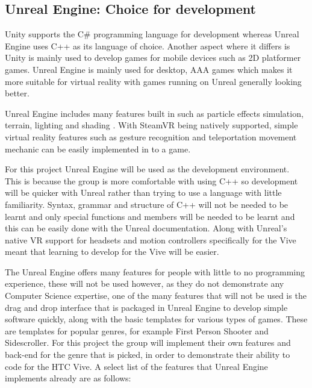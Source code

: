 \subsection{Unreal Engine: Choice for development}
Unity supports the C\# programming language for development whereas Unreal Engine uses C++ as its language of choice. Another aspect where it differs is Unity is mainly used to develop games for mobile devices such as 2D platformer games. Unreal Engine is mainly used for desktop, AAA games which makes it more suitable for virtual reality with games running on Unreal generally looking better.
\newline
\par
Unreal Engine includes many features built in such as particle effects simulation, terrain, lighting and shading \cite{unrealfeatures}. With SteamVR being natively supported, simple virtual reality features such as gesture recognition and teleportation movement mechanic can be easily implemented in to a game.
\newline
\par
For this project Unreal Engine will be used as the development environment. This is because the group is more comfortable with using C++ so development will be quicker with Unreal rather than trying to use a language with little familiarity. Syntax, grammar and structure of C++ will not be needed to be learnt and only special functions and members will be needed to be learnt and this can be easily done with the Unreal documentation. Along with Unreal's native VR support for headsets and motion controllers specifically for the Vive meant that learning to develop for the Vive will be easier.
\newline
\par
The Unreal Engine offers many features for people with little to no programming experience, these will not be used however, as they do not demonstrate any Computer Science expertise, one of the many features that will not be used is the drag and drop interface that is packaged in Unreal Engine to develop simple software quickly, along with the basic templates for various types of games. These are templates for popular genres, for example First Person Shooter and Sidescroller. For this project the group will implement their own features and back-end for the genre that is picked, in order to demonstrate their ability to code for the HTC Vive. A select list of the features that Unreal Engine implements already are as follows:

